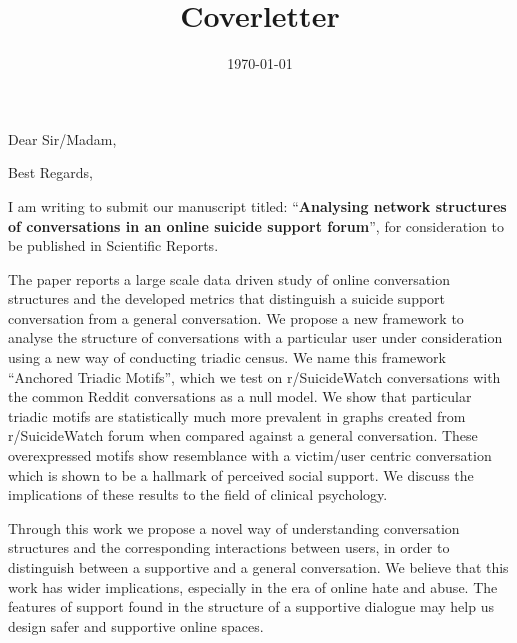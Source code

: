 \documentclass[11pt,a4paper,roman]{moderncv}        %
\title{Coverletter}                               %
\begin{document}
    \date{\today}
    \opening{Dear Sir/Madam,}
    \closing{Best Regards,}
    \makelettertitle
    
    
   I am writing to submit our manuscript titled: ``\textbf{Analysing network structures of conversations in an online suicide support forum}'', for consideration to be published in Scientific Reports.
   
   The paper reports a large scale data driven study of online conversation structures and the developed metrics that distinguish a suicide support conversation from a general conversation. We propose a new framework to analyse the structure of conversations with a particular user under consideration using a new way of conducting triadic census.  We name this framework ``Anchored Triadic Motifs'', which we test on r/SuicideWatch conversations with the common Reddit conversations as a null model. We show that particular triadic motifs are statistically much more prevalent in graphs created from r/SuicideWatch forum when compared against a general conversation. These overexpressed motifs show resemblance with a victim/user centric conversation which is shown to be a hallmark of perceived social support. We discuss the implications of these results to the field of clinical psychology. 
   
   Through this work we propose a novel way of understanding conversation structures and the corresponding interactions between users, in order to distinguish between a supportive and a general conversation. 
   We believe that this work has wider implications, especially in the era of online hate and abuse. The features of support found in the structure of a supportive dialogue may help us design safer and supportive online spaces.
  
\end{document}
